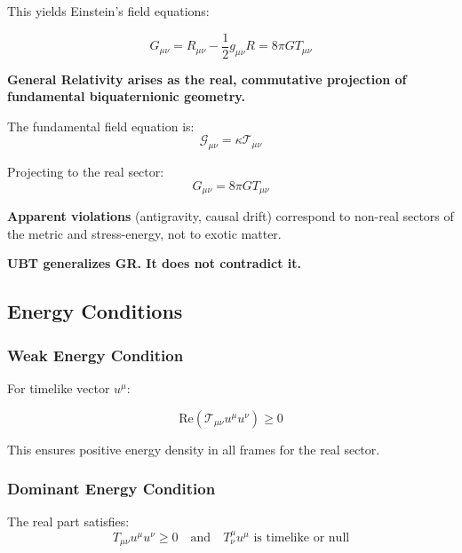 This yields Einstein's field equations:

\begin{equation}
\label{eq:canonical:einstein_from_stress}
\boxed{G_{\mu\nu} = R_{\mu\nu} - \frac{1}{2} g_{\mu\nu} R = 8\pi G T_{\mu\nu}}
\end{equation}

\begin{tcolorbox}[colback=blue!5!white,colframe=blue!75!black,title=General Relativity as Real Projection]
\textbf{General Relativity arises as the real, commutative projection of fundamental biquaternionic geometry.}

The fundamental field equation is:
\begin{equation}
\mathcal{G}_{\mu\nu} = \kappa \mathcal{T}_{\mu\nu}
\end{equation}

Projecting to the real sector:
\begin{equation}
G_{\mu\nu} = 8\pi G T_{\mu\nu}
\end{equation}

\textbf{Apparent violations} (antigravity, causal drift) correspond to non-real sectors of the metric and stress-energy, not to exotic matter.

\textbf{UBT generalizes GR. It does not contradict it.}
\end{tcolorbox}

\subsection{Energy Conditions}

\subsubsection{Weak Energy Condition}

For timelike vector $u^\mu$:

\begin{equation}
\text{Re}(\mathcal{T}_{\mu\nu} u^\mu u^\nu) \geq 0
\end{equation}

This ensures positive energy density in all frames for the real sector.

\subsubsection{Dominant Energy Condition}

The real part satisfies:
\begin{equation}
T_{\mu\nu} u^\mu u^\nu \geq 0 \quad \text{and} \quad T^\mu_\nu u^\mu \text{ is timelike or null}
\end{equation}

